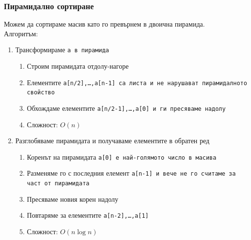 \documentclass{beamer}
\begin{document}
\begin{frame}
  \frametitle{Пирамидално сортиране}

  Можем да сортираме масив като го превърнем в двоична пирамида.\\
  \pause
  Алгоритъм:
  \renewcommand{\theenumii}{\alph{enumii}}
  \begin{enumerate}[<+->]
  \item Трансформираме \tt a в пирамида
    \begin{enumerate}[<+(1)->]
    \item Строим пирамидата отдолу-нагоре
    \item Елементите \tt{a[n/2]},\ldots,\tt{a[n-1]} са листа и не нарушават пирамидалното свойство
    \item Обхождаме елементите \tt{a[n/2-1]},\ldots,\tt{a[0]} и ги пресяваме надолу
    \item Сложност: $O(n)$
    \end{enumerate}
  \item<3-> Разглобяваме пирамидата и получаваме елементите в обратен ред%
    \begin{enumerate}[<+(1)->]
    \item Коренът на пирамидата \tt{a[0]} е най-голямото число в масива
    \item Разменяме го с последния елемент \tt{a[n-1]} и вече не го считаме за част от пирамидата
    \item Пресяваме новия корен надолу
    \item Повтаряме за елементите \tt{a[n-2]},\ldots,\tt{a[1]}
    \item Сложност: $O(n\log n)$
    \end{enumerate}
  \end{enumerate}
\end{frame}
\end{document}
